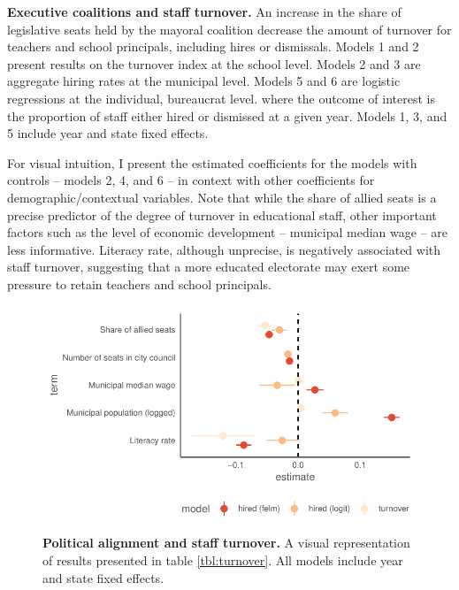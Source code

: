 \documentclass[12pt,a4paper]{article}
\begin{document}
\begin{landscape}
    \begin{table}[t]
      \centering
      \footnotesize
      
      \caption{{\bf Executive coalitions and staff turnover.} An increase in the share of legislative seats held by the mayoral coalition decrease the amount of turnover for teachers and school principals, including hires or dismissals. Models 1 and 2 present results on the turnover index at the school level. Models 2 and 3 are aggregate hiring rates at the municipal level. Models 5 and 6 are logistic regressions at the individual, bureaucrat level. where the outcome of interest is the proportion of staff either hired or dismissed at a given year. Models 1, 3, and 5 include year and state fixed effects.}
      \label{tbl:turnover}
    \end{table}
\end{landscape}

For visual intuition, I present the estimated coefficients for the models with controls -- models 2, 4, and 6 -- in context with other coefficients for demographic/contextual variables. Note that while the share of allied seats is a precise predictor of the degree of turnover in educational staff, other important factors such as the level of economic development -- municipal median wage -- are less informative. Literacy rate, although unprecise, is negatively associated with staff turnover, suggesting that a more educated electorate may exert some pressure to retain teachers and school principals. 

\begin{figure}[h]
    \centering
    \includegraphics{plots/plot_coalition_coef_mun.pdf}
    \caption{{\bf Political alignment and staff turnover.} A visual representation of results presented in table \ref{tbl:turnover}. All models include year and state fixed effects.}
    \label{fig:coalition_turnover}
\end{figure}
\end{document}
